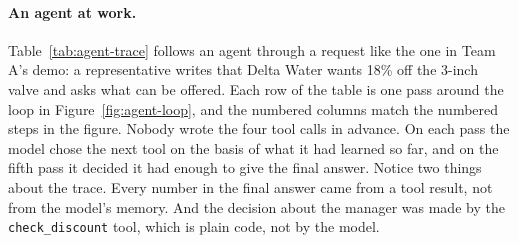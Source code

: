 \paragraph{An agent at work.} Table~\ref{tab:agent-trace} follows an agent through a request like the one in Team A's demo: a representative writes that Delta Water wants 18\% off the 3-inch valve and asks what can be offered. Each row of the table is one pass around the loop in Figure~\ref{fig:agent-loop}, and the numbered columns match the numbered steps in the figure. Nobody wrote the four tool calls in advance. On each pass the model chose the next tool on the basis of what it had learned so far, and on the fifth pass it decided it had enough to give the final answer. Notice two things about the trace. Every number in the final answer came from a tool result, not from the model's memory. And the decision about the manager was made by the \texttt{check\_discount} tool, which is plain code, not by the model.

\providecommand{\stepbadge}[1]{\tikz[baseline=(b.base)]\node[circle, fill=black!75, text=white, font=\scriptsize\bfseries, inner sep=0pt, minimum size=4.2mm] (b) {#1};}

